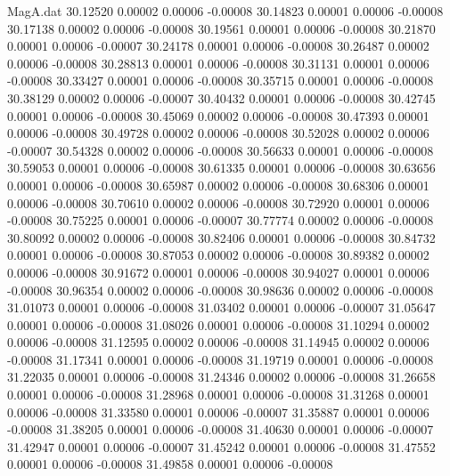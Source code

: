 \begin{filecontents}{MagA.dat}
  30.12520    0.00002    0.00006   -0.00008
  30.14823    0.00001    0.00006   -0.00008
  30.17138    0.00002    0.00006   -0.00008
  30.19561    0.00001    0.00006   -0.00008
  30.21870    0.00001    0.00006   -0.00007
  30.24178    0.00001    0.00006   -0.00008
  30.26487    0.00002    0.00006   -0.00008
  30.28813    0.00001    0.00006   -0.00008
  30.31131    0.00001    0.00006   -0.00008
  30.33427    0.00001    0.00006   -0.00008
  30.35715    0.00001    0.00006   -0.00008
  30.38129    0.00002    0.00006   -0.00007
  30.40432    0.00001    0.00006   -0.00008
  30.42745    0.00001    0.00006   -0.00008
  30.45069    0.00002    0.00006   -0.00008
  30.47393    0.00001    0.00006   -0.00008
  30.49728    0.00002    0.00006   -0.00008
  30.52028    0.00002    0.00006   -0.00007
  30.54328    0.00002    0.00006   -0.00008
  30.56633    0.00001    0.00006   -0.00008
  30.59053    0.00001    0.00006   -0.00008
  30.61335    0.00001    0.00006   -0.00008
  30.63656    0.00001    0.00006   -0.00008
  30.65987    0.00002    0.00006   -0.00008
  30.68306    0.00001    0.00006   -0.00008
  30.70610    0.00002    0.00006   -0.00008
  30.72920    0.00001    0.00006   -0.00008
  30.75225    0.00001    0.00006   -0.00007
  30.77774    0.00002    0.00006   -0.00008
  30.80092    0.00002    0.00006   -0.00008
  30.82406    0.00001    0.00006   -0.00008
  30.84732    0.00001    0.00006   -0.00008
  30.87053    0.00002    0.00006   -0.00008
  30.89382    0.00002    0.00006   -0.00008
  30.91672    0.00001    0.00006   -0.00008
  30.94027    0.00001    0.00006   -0.00008
  30.96354    0.00002    0.00006   -0.00008
  30.98636    0.00002    0.00006   -0.00008
  31.01073    0.00001    0.00006   -0.00008
  31.03402    0.00001    0.00006   -0.00007
  31.05647    0.00001    0.00006   -0.00008
  31.08026    0.00001    0.00006   -0.00008
  31.10294    0.00002    0.00006   -0.00008
  31.12595    0.00002    0.00006   -0.00008
  31.14945    0.00002    0.00006   -0.00008
  31.17341    0.00001    0.00006   -0.00008
  31.19719    0.00001    0.00006   -0.00008
  31.22035    0.00001    0.00006   -0.00008
  31.24346    0.00002    0.00006   -0.00008
  31.26658    0.00001    0.00006   -0.00008
  31.28968    0.00001    0.00006   -0.00008
  31.31268    0.00001    0.00006   -0.00008
  31.33580    0.00001    0.00006   -0.00007
  31.35887    0.00001    0.00006   -0.00008
  31.38205    0.00001    0.00006   -0.00008
  31.40630    0.00001    0.00006   -0.00007
  31.42947    0.00001    0.00006   -0.00007
  31.45242    0.00001    0.00006   -0.00008
  31.47552    0.00001    0.00006   -0.00008
  31.49858    0.00001    0.00006   -0.00008

\end{filecontents}
